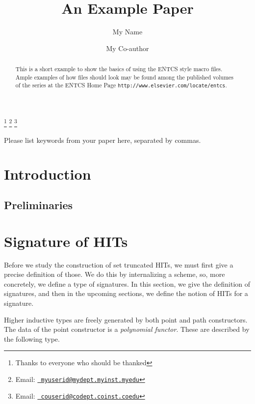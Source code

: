 \documentclass[9pt]{entcs}
\newcommand{\1}{\type{1}} %
\begin{document}
\begin{frontmatter}
  \title{An Example Paper} \author{My
    Name}
  \address{My Department\\ My University\\
    My City, My Country} \author{My Co-author}
  \address{My Co-author's Department\\My Co-author's University\\
    My Co-author's City, My Co-author's Country} \thanks[ALL]{Thanks
    to everyone who should be thanked} \thanks[myemail]{Email:
    \href{mailto:myuserid@mydept.myinst.myedu} {\texttt{\normalshape
        myuserid@mydept.myinst.myedu}}} \thanks[coemail]{Email:
    \href{mailto:couserid@codept.coinst.coedu} {\texttt{\normalshape
        couserid@codept.coinst.coedu}}}
\begin{abstract} 
  This is a short example to show the basics of using the ENTCS style
  macro files.  Ample examples of how files should look may be found
  among the published volumes of the series at the ENTCS Home Page
  \texttt{http://www.elsevier.com/locate/entcs}.
\end{abstract}
\begin{keyword}
  Please list keywords from your paper here, separated by commas.
\end{keyword}
\end{frontmatter}
\section{Introduction}
\label{intro}

\subsection*{Preliminaries}

\section{Signature of HITs}
Before we study the construction of set truncated HITs, we must first give a precise definition of those.
We do this by internalizing a scheme, so, more concretely, we define a type of signatures.
In this section, we give the definition of signatures, and then in the upcoming sections, we define the notion of HITs for a signature.

Higher inductive types are freely generated by both point and path constructors.
The data of the point constructor is a \emph{polynomial functor}.
These are described by the following type.
\end{document}
